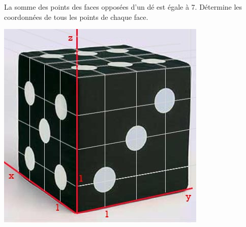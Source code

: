 
La somme des points des faces opposées d'un dé est égale à 7. Détermine les coordonnées de tous les points de chaque face.

\includegraphics[scale=0.5]{RepE-22.jpg} 
